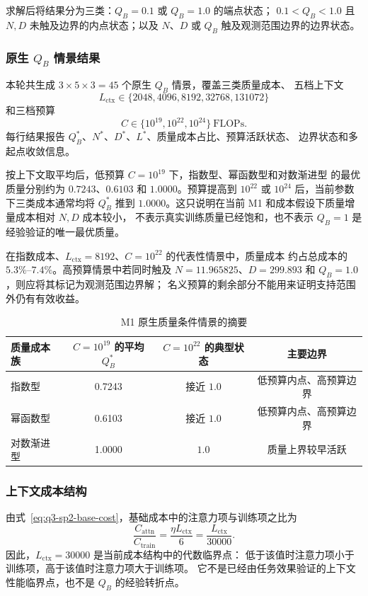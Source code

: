 求解后将结果分为三类：$Q_B=0.1$ 或 $Q_B=1.0$ 的端点状态；
$0.1<Q_B<1.0$ 且 $N,D$ 未触及边界的内点状态；以及 $N$、$D$ 或 $Q_B$
触及观测范围边界的边界状态。

\subsubsection{\texorpdfstring{原生 $Q_B$ 情景结果}{原生 Q\_B 情景结果}}

本轮共生成 $3\times5\times3=45$ 个原生 $Q_B$ 情景，覆盖三类质量成本、
五档上下文
\[
L_{\mathrm{ctx}}\in\{2048,4096,8192,32768,131072\}
\]
和三档预算
\[
C\in\{10^{19},10^{22},10^{24}\}\ \mathrm{FLOPs}.
\]
每行结果报告 $Q_B^*$、$N^*$、$D^*$、$L^*$、质量成本占比、预算活跃状态、
边界状态和多起点收敛信息。

按上下文取平均后，低预算 $C=10^{19}$ 下，指数型、幂函数型和对数渐进型
的最优质量分别约为 $0.7243$、$0.6103$ 和 $1.0000$。预算提高到
$10^{22}$ 或 $10^{24}$ 后，当前参数下三类成本通常均将 $Q_B^*$ 推到
$1.0000$。这只说明在当前 M1 和成本假设下质量增量成本相对 $N,D$ 成本较小，
不表示真实训练质量已经饱和，也不表示 $Q_B=1$ 是经验验证的唯一最优质量。

在指数成本、$L_{\mathrm{ctx}}=8192$、$C=10^{22}$ 的代表性情景中，质量成本
约占总成本的 $5.3\%$--$7.4\%$。高预算情景中若同时触及
$N=11.965825$、$D=299.893$ 和 $Q_B=1.0$，则应将其标记为观测范围边界解；
名义预算的剩余部分不能用来证明支持范围外仍有有效收益。

\begin{table}[htbp]
  \centering
  \caption{M1 原生质量条件情景的摘要}
  \label{tab:q3-sp2-summary}
  \small
  \begin{tabular}{lccc}
    \toprule
    质量成本族 & $C=10^{19}$ 的平均 $Q_B^*$ &
    $C=10^{22}$ 的典型状态 & 主要边界 \\
    \midrule
    指数型 & 0.7243 & 接近 $1.0$ & 低预算内点、高预算边界 \\
    幂函数型 & 0.6103 & 接近 $1.0$ & 低预算内点、高预算边界 \\
    对数渐进型 & 1.0000 & $1.0$ & 质量上界较早活跃 \\
    \bottomrule
  \end{tabular}
\end{table}

\subsubsection{上下文成本结构}

由式~\eqref{eq:q3-sp2-base-cost}，基础成本中的注意力项与训练项之比为
\begin{equation}
  \frac{C_{\mathrm{attn}}}{C_{\mathrm{train}}}
  =\frac{\eta L_{\mathrm{ctx}}}{6}
  =\frac{L_{\mathrm{ctx}}}{30000}.
  \label{eq:q3-sp2-context-ratio}
\end{equation}
因此，$L_{\mathrm{ctx}}=30000$ 是当前成本结构中的代数临界点：
低于该值时注意力项小于训练项，高于该值时注意力项大于训练项。
它不是已经由任务效果验证的上下文性能临界点，也不是 $Q_B$ 的经验转折点。


